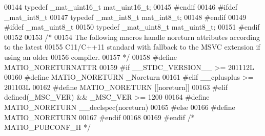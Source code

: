\begin{DoxyCode}
00144     \textcolor{keyword}{typedef} \_mat\_uint16\_t mat\_uint16\_t;
00145 \textcolor{preprocessor}{#endif}
00146 \textcolor{preprocessor}{#ifdef \_mat\_int8\_t}
00147     \textcolor{keyword}{typedef} \_mat\_int8\_t mat\_int8\_t;
00148 \textcolor{preprocessor}{#endif}
00149 \textcolor{preprocessor}{#ifdef \_mat\_uint8\_t}
00150     \textcolor{keyword}{typedef} \_mat\_uint8\_t mat\_uint8\_t;
00151 \textcolor{preprocessor}{#endif}
00152 
00153 \textcolor{comment}{/* }
00154 \textcolor{comment}{  The following macros handle noreturn attributes according to the latest}
00155 \textcolor{comment}{  C11/C++11 standard with fallback to the MSVC extension if using an older}
00156 \textcolor{comment}{  compiler.}
00157 \textcolor{comment}{*/}
00158 \textcolor{preprocessor}{#define MATIO\_NORETURNATTR}
00159 \textcolor{preprocessor}{#if \_\_STDC\_VERSION\_\_ >= 201112L}
00160 \textcolor{preprocessor}{#define MATIO\_NORETURN \_Noreturn}
00161 \textcolor{preprocessor}{#elif \_\_cplusplus >= 201103L}
00162 \textcolor{preprocessor}{#define MATIO\_NORETURN [[noreturn]]}
00163 \textcolor{preprocessor}{#elif defined(\_MSC\_VER) && \_MSC\_VER >= 1200}
00164 \textcolor{preprocessor}{#define MATIO\_NORETURN \_\_declspec(noreturn)}
00165 \textcolor{preprocessor}{#else}
00166 \textcolor{preprocessor}{#define MATIO\_NORETURN}
00167 \textcolor{preprocessor}{#endif}
00168 
00169 \textcolor{preprocessor}{#endif }\textcolor{comment}{/* MATIO\_PUBCONF\_H */}\textcolor{preprocessor}{}
\end{DoxyCode}
